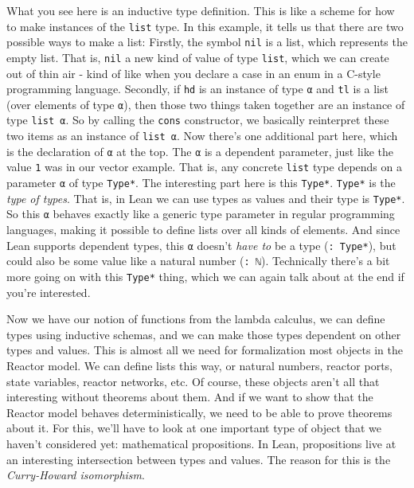 \documentclass{article}
\begin{document}
What you see here is an inductive type definition. This is like a scheme
for how to make instances of the \lstinline{list} type. In this example, it
tells us that there are two possible ways to make a list: Firstly, the
symbol \lstinline{nil} is a list, which represents the empty list. That is,
\lstinline{nil} a new kind of value of type \lstinline{list}, which we can
create out of thin air - kind of like when you declare a case in an enum
in a C-style programming language. Secondly, if \lstinline{hd} is an
instance of type \lstinline{α} and \lstinline{tl} is a list (over elements of
type \lstinline{α}), then those two things taken together are an instance
of type \lstinline{list α}. So by calling the \lstinline{cons} constructor,
we basically reinterpret these two items as an instance of
\lstinline{list α}. Now there's one additional part here, which is the
declaration of \lstinline{α} at the top. The \lstinline{α} is a dependent
parameter, just like the value \lstinline{1} was in our vector example.
That is, any concrete \lstinline{list} type depends on a parameter
\lstinline{α} of type \lstinline{Type*}. The interesting part here is this
\lstinline{Type*}. \lstinline{Type*} is the \emph{type of types}. That is, in
Lean we can use types as values and their type is \lstinline{Type*}. So
this \lstinline{α} behaves exactly like a generic type parameter in regular
programming languages, making it possible to define lists over all kinds
of elements. And since Lean supports dependent types, this \lstinline{α}
doesn't \emph{have to} be a type (\lstinline{: Type*}), but could also be
some value like a natural number (\lstinline{: ℕ}). Technically there's a
bit more going on with this \lstinline{Type*} thing, which we can again
talk about at the end if you're interested.

Now we have our notion of functions from the lambda calculus, we can
define types using inductive schemas, and we can make those types
dependent on other types and values. This is almost all we need for
formalization most objects in the Reactor model. We can define lists
this way, or natural numbers, reactor ports, state variables, reactor
networks, etc. Of course, these objects aren't all that interesting
without theorems about them. And if we want to show that the Reactor
model behaves deterministically, we need to be able to prove theorems
about it. For this, we'll have to look at one important type of object
that we haven't considered yet: mathematical propositions. In Lean,
propositions live at an interesting intersection between types and
values. The reason for this is the \emph{Curry-Howard isomorphism}.
\end{document}
